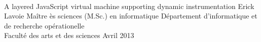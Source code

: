 \documentclass[letterpaper,9pt]{report}
\begin{document}


% 


\newpage
\addtocounter{page}{-1}
\thispagestyle{empty}
\vspace{1cm}
\ \\
\newpage
\titrememoire
    {A layered JavaScript virtual machine supporting dynamic instrumentation}
	{Erick Lavoie}
	{Ma\^itre \`es sciences (M.Sc.) en informatique}
	{D\'epartement d'informatique et de recherche op\'erationelle\\
    Facult\'e des arts et des sciences}
	{Avril}
    {2013}



%

%

%









%





\appendix

\newpage
\addtocounter{page}{-1}
\thispagestyle{empty}
\vspace{1cm}
\ \\
\end{document}
